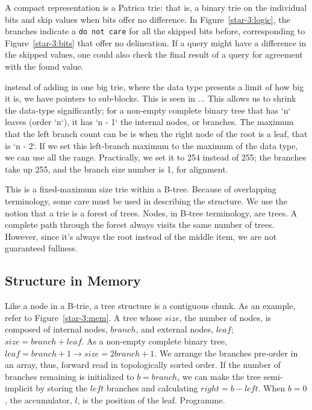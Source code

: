 \documentclass[12pt]{article}
\newcommand{\code}[1]{\colorbox{light-gray}{\texttt{#1}}}
\begin{document}
A compact representation is a Patrica trie\cite{morrison1968patricia}: that is, a binary trie on the individual bits and skip values when bits offer no difference. In Figure~\ref{star-3:logic}, the branches indicate a \code{do not care} for all the skipped bits before, corresponding to Figure~\ref{star-3:bits} that offer no delineation. If a query might have a difference in the skipped values, one could also check the final result of a query for agreement with the found value.

instead of adding in one big trie, where the data type presents a limit of how big it is, we have pointers to sub-blocks. This is seen in ... This allows us to shrink the data-type significantly; for a non-empty complete binary tree that has `n` leaves (order `n`), it has `n - 1` the internal nodes, or branches. The maximum that the left branch count can be is when the right node of the root is a leaf, that is `n - 2`. If we set this left-branch maximum to the maximum of the data type, we can use all the range. Practically, we set it to 254 instead of 255; the branches take up 255, and the branch size number is 1, for alignment.

This is a fixed-maximum size trie within a B-tree. Because of overlapping terminology, some care must be used in describing the structure. We use the notion that a trie is a forest of trees. Nodes, in B-tree terminology, are trees. A complete path through the forest always visits the same number of trees. However, since it's always the root instead of the middle item, we are not guaranteed fullness.

\subsection{Structure in Memory}

Like a node in a B-trie, a tree structure is a contiguous chunk. As an example, refer to Figure~\ref{star-3:mem}. A tree whose $\mathit{size}$, the number of nodes, is composed of internal nodes, $\mathit{branch}$, and external nodes, $\mathit{leaf}$; $\mathit{size} = \mathit{branch} + \mathit{leaf}$. As a non-empty complete binary tree, $\mathit{leaf} = \mathit{branch} + 1 \rightarrow \mathit{size} = 2\mathit{branch} + 1$. We arrange the branches pre-order in an array, thus, forward read in topologically sorted order. If the number of branches remaining is initialized to $b = \mathit{branch}$, we can make the tree semi-implicit by storing the $\mathit{left}$ branches and calculating $\mathit{right} = b - \mathit{left}$. When $b = 0$, the accumulator, $l$, is the position of the leaf. Programme.
\end{document}
